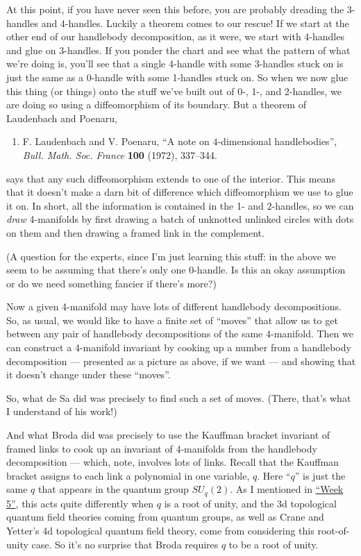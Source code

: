 \documentclass[12pt]{article}
\begin{document}
At this point, if you have never seen this before, you are probably
dreading the 3-handles and 4-handles. Luckily a theorem comes to our
rescue! If we start at the other end of our handlebody decomposition, as
it were, we start with 4-handles and glue on 3-handles. If you ponder
the chart and see what the pattern of what we're doing is, you'll see
that a single 4-handle with some 3-handles stuck on is just the same as
a 0-handle with some 1-handles stuck on. So when we now glue this thing
(or things) onto the stuff we've built out of 0-, 1-, and 2-handles, we
are doing so using a diffeomorphism of its boundary. But a theorem of
Laudenbach and Poenaru,

\begin{enumerate}
\def\labelenumi{\arabic{enumi})}
\setcounter{enumi}{4}
\item 
F. Laudenbach and V. Poenaru, 
``A note on \(4\)-dimensional handlebodies'', \emph{Bull. Math. Soc. France} \textbf{100} (1972),
337--344.
\end{enumerate}
\noindent
says that any such diffeomorphism extends to one of the interior. This
means that it doesn't make a darn bit of difference which diffeomorphism
we use to glue it on. In short, all the information is contained in the
1- and 2-handles, so we can \emph{draw} 4-manifolds by first drawing a
batch of unknotted unlinked circles with dots on them and then drawing a
framed link in the complement.

(A question for the experts, since I'm just learning this stuff: in
the above we seem to be assuming that there's only one 0-handle. Is this
an okay assumption or do we need something fancier if there's more?)

Now a given 4-manifold may have lots of different handlebody
decompositions. So, as usual, we would like to have a finite set of
``moves'' that allow us to get between any pair of handlebody
decompositions of the same 4-manifold. Then we can construct a
4-manifold invariant by cooking up a number from a handlebody
decomposition --- presented as a picture as above, if we want --- and
showing that it doesn't change under these ``moves''.

So, what de Sa did was precisely to find such a set of moves. (There,
that's what I understand of his work!)

And what Broda did was precisely to use the Kauffman bracket invariant
of framed links to cook up an invariant of 4-manifolds from the
handlebody decomposition --- which, note, involves lots of links. Recall
that the Kauffman bracket assigns to each link a polynomial in one
variable, \(q\). Here ``\(q\)'' is just the same \(q\) that appears in
the quantum group \(SU_q(2)\). As I mentioned in
\protect\hyperlink{week5}{``Week 5''}, this acts quite differently when
\(q\) is a root of unity, and the 3d topological quantum field theories
coming from quantum groups, as well as Crane and Yetter's 4d topological
quantum field theory, come from considering this root-of-unity case. So
it's no surprise that Broda requires \(q\) to be a root of unity.
\end{document}
